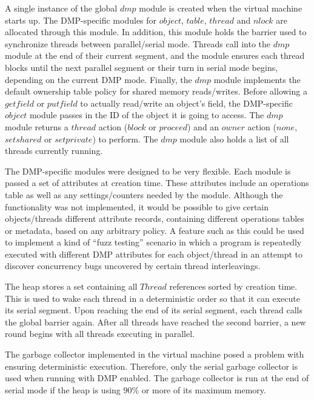 
A single instance of the global $dmp$ module is created when the
virtual machine starts up.  The DMP-specific modules for $object$,
$table$, $thread$ and $nlock$ are allocated through this module.  In
addition, this module holds the barrier used to synchronize threads
between parallel/serial mode.  Threads call into the $dmp$ module at
the end of their current segment, and the module ensures each thread
blocks until the next parallel segment or their turn in serial mode
begins, depending on the current DMP mode.  Finally, the $dmp$ module
implements the default ownership table policy for shared memory
reads/writes.  Before allowing a $getfield$ or $putfield$ to actually
read/write an object's field, the DMP-specific $object$ module passes
in the ID of the object it is going to access.  The $dmp$ module
returns a $thread$ action ($block$ or $proceed$) and an $owner$ action
($none$, $set shared$ or $set private$) to perform.  The $dmp$ module
also holds a list of all threads currently running.

The DMP-specific modules were designed to be very flexible.  Each
module is passed a set of attributes at creation time.  These
attributes include an operations table as well as any
settings/counters needed by the module.  Although the functionality
was not implemented, it would be possible to give certain
objects/threads different attribute records, containing different
operations tables or metadata, based on any arbitrary policy.  A
feature such as this could be used to implement a kind of ``fuzz
testing'' scenario in which a program is repeatedly executed with
different DMP attributes for each object/thread in an attempt to
discover concurrency bugs uncovered by certain thread interleavings.

The heap stores a set containing all $Thread$ references sorted by
creation time.  This is used to wake each thread in a deterministic
order so that it can execute its serial segment.  Upon reaching the
end of its serial segment, each thread calls the global barrier again.
After all threads have reached the second barrier, a new round begins
with all threads executing in parallel.

The garbage collector implemented in the virtual machine posed a
problem with ensuring deterministic execution.  Therefore, only the
serial garbage collector is used when running with DMP enabled.  The
garbage collector is run at the end of serial mode if the heap is
using $90\%$ or more of its maximum memory.


